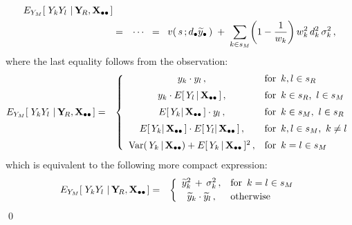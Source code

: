 \begin{enumerate}
\begin{eqnarray*}
        E_{Y_{M}}\!\left[\;
            Y_{k}Y_{l}
            \,\left\vert\,
            \mathbf{Y}_{\!R},\mathbf{X}_{\bullet\bullet}
            \right.
            \right]
    \\
    & = &
        \cdots
        \;\; = \;\;
        v(\,s\,;d_{\bullet}\widetilde{y}_{\bullet}\,)
        \;+\;
        \underset{k \in s_{M}}{\sum}\!
        \left(1-\dfrac{1}{w_{k}}\right)
        w_{k}^{2}\,d_{k}^{2}\,\sigma_{k}^{2}\,,
    \end{eqnarray*}
    where the last equality follows from the observation:
    \begin{eqnarray*}
    E_{Y_{M}}\!\left[\;
        Y_{k}Y_{l}
        \,\left\vert\,
        \YsubR,\Xobs
        \right.
        \right]
    & = &
        \left\{\begin{array}{cl}
            y_{k} \cdot y_{l}\,, & \underset{{\color{white}.}}{\textnormal{for \,$k,l \in s_{R}$}}
            \\
            y_{k} \cdot E[\,Y_{l}\,\vert\,\Xobs\,]\,, & \underset{{\color{white}.}}{\textnormal{for \,$k \in s_{R}$,\, $l \in s_{M}$}}
            \\
            E[\,Y_{k}\vert\,\Xobs\,] \cdot y_{l}\,, & \underset{{\color{white}.}}{\textnormal{for \,$k \in s_{M}$,\, $l \in s_{R}$}}
            \\
            E[\,Y_{k}\vert\,\Xobs\,] \cdot E[\,Y_{l}\vert\,\Xobs\,]\,, & \underset{{\color{white}.}}{\textnormal{for \,$k,l \in s_{M}$,\, $k \neq l$}}
            \\
            \Var(\,Y_{k}\,\vert\,\Xobs) + E[\,Y_{k}\,\vert\,\Xobs\,]^{2}\,, & \textnormal{for \,$k = l \in s_{M}$}
            \end{array}\right.
    \end{eqnarray*}
    which is equivalent to the following more compact expression:
    \begin{eqnarray*}
    E_{Y_{M}}\!\left[\;
        Y_{k}Y_{l}
        \,\left\vert\,
        \YsubR,\Xobs
        \right.
        \right]
    & = &
        \left\{\begin{array}{cl}
            \widetilde{y}_{k}^{2} \,+\, \sigma_{k}^{2}\,, & \textnormal{for \,$k = l \in s_{M}$}
            \\
            \widetilde{y}_{k} \cdot \widetilde{y}_{l}\,, & \overset{{\color{white}.}}{\textnormal{otherwise}}
            \end{array}\right.
    \end{eqnarray*}
    \vskip -0.7cm
    \qed
\end{enumerate}

